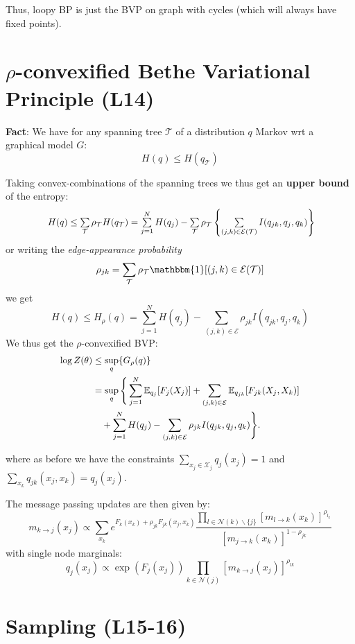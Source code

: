 \documentclass[9pt]{article}
\begin{document}
\begin{multicols}{2}
Thus, loopy BP is just the BVP on graph with cycles (which will
always have fixed points).

\section{$\rho$-convexified Bethe Variational Principle (L14)}

\textbf{Fact}: We have for any spanning tree $\mathcal{T}$ of a distribution $q$ Markov wrt a graphical model $G$: $$H(q) \le H(q_{\mathcal{T}})$$

Taking convex-combinations of the spanning trees we thus get an \textbf{upper bound} of the entropy:
\[
\scalebox{0.95}{
\(
H(q) \le \sum\limits_{\mathcal{T}}\rho_{\mathcal{T}}H(q_{\mathcal{T}}) 
= \sum\limits_{j=1}^{N}H(q_j)-\sum\limits_{\mathcal{T}}\rho_{\mathcal{T}}\left\{
\sum\limits_{(j,k) \in \mathcal{E}(\mathcal{T})} I(q_{jk},q_j,q_k)\right\}
\)}
\]
or writing the \textit{edge-appearance probability} $$\rho_{jk}=\sum_{\mathcal{T}}\rho_{\mathcal{T}}\mathbbm{1}[(j,k) \in \mathcal{E}(\mathcal{T})]$$ we get $$H(q) \le H_{\rho}(q) = \sum\limits_{j=1}^{N}H(q_j)-\sum\limits_{(j,k) \in \mathcal{E}}\rho_{jk}I(q_{jk},q_j,q_k)$$
We thus get the $\rho$-convexified BVP:
\[
\scalebox{0.95}{
\(
\begin{aligned}
\log Z(\theta) &\leq \sup\limits_{q} \{G_\rho(q)\} \\
&= \sup\limits_{q} \Bigg\{
\sum\limits_{j=1}^{N} \mathbb{E}_{q_j}[F_j(X_j)] 
+ \sum\limits_{(j,k) \in \mathcal{E}} \mathbb{E}_{q_{jk}}[F_{jk}(X_j, X_k)] \\
&\quad + \sum\limits_{j=1}^{N} H(q_j) 
- \sum\limits_{(j,k) \in \mathcal{E}} \rho_{jk} I(q_{jk}, q_j, q_k)
\Bigg\}.
\end{aligned}
\)
}
\]

where as before we have the constraints $\sum_{x_j \in \mathcal{X}_j}q_j(x_j)=1$ and $\sum_{x_k}q_{jk}(x_j,x_k)=q_j(x_j)$. 

The message passing updates are then given by:
$$m_{k \to j}(x_j) \propto \sum\limits_{x_k}e^{F_k(x_k)+\rho_{jk}F_{jk}(x_j,x_k)} \frac{\prod\limits_{l \in \mathcal{N}(k)\backslash \{j\}}[m_{l \to k}(x_k)]^{\rho_{l_k}}}
{[m_{j \to k}(x_k)]^{1-\rho_{jk}}}$$
with single node marginals:
$$q_{j}(x_j) \propto \exp(F_j(x_j))\prod_{k \in \mathcal{N}(j)}
[m_{k \to j}(x_j)]^{\rho_{lk}}$$
\section{Sampling (L15-16)}


\end{multicols}
\end{document}
